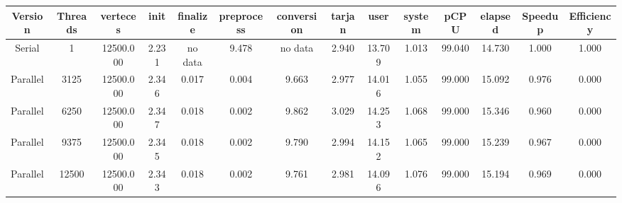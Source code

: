 \begin{tabular}{|c|c|c|c|c|c|c|c|c|c|c|c|c|c|}
\toprule
 Version &  Threads &  verteces &  init & finalize &  preprocess & conversion &  tarjan &   user &  system &   pCPU &  elapsed &  Speedup &  Efficiency \\
\midrule
  Serial &        1 & 12500.000 & 2.231 &  no data &       9.478 &    no data &   2.940 & 13.709 &   1.013 & 99.040 &   14.730 &    1.000 &       1.000 \\
Parallel &     3125 & 12500.000 & 2.346 &    0.017 &       0.004 &      9.663 &   2.977 & 14.016 &   1.055 & 99.000 &   15.092 &    0.976 &       0.000 \\
Parallel &     6250 & 12500.000 & 2.347 &    0.018 &       0.002 &      9.862 &   3.029 & 14.253 &   1.068 & 99.000 &   15.346 &    0.960 &       0.000 \\
Parallel &     9375 & 12500.000 & 2.345 &    0.018 &       0.002 &      9.790 &   2.994 & 14.152 &   1.065 & 99.000 &   15.239 &    0.967 &       0.000 \\
Parallel &    12500 & 12500.000 & 2.343 &    0.018 &       0.002 &      9.761 &   2.981 & 14.096 &   1.076 & 99.000 &   15.194 &    0.969 &       0.000 \\
\bottomrule
\end{tabular}
